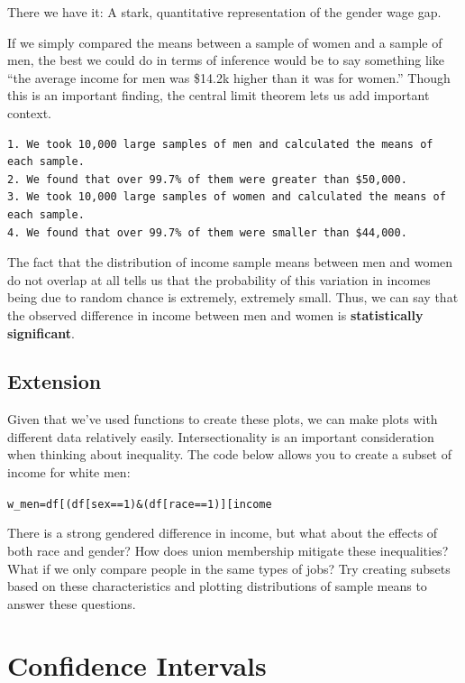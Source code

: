 \documentclass[
  letterpaper,
  DIV=11,
  numbers=noendperiod]{scrreprt}
\begin{document}
There we have it: A stark, quantitative representation of the gender
wage gap.

If we simply compared the means between a sample of women and a sample
of men, the best we could do in terms of inference would be to say
something like ``the average income for men was \$14.2k higher than it
was for women.'' Though this is an important finding, the central limit
theorem lets us add important context.

\begin{verbatim}
1. We took 10,000 large samples of men and calculated the means of each sample.
2. We found that over 99.7% of them were greater than $50,000. 
3. We took 10,000 large samples of women and calculated the means of each sample.
4. We found that over 99.7% of them were smaller than $44,000.
\end{verbatim}

The fact that the distribution of income sample means between men and
women do not overlap at all tells us that the probability of this
variation in incomes being due to random chance is extremely, extremely
small. Thus, we can say that the observed difference in income between
men and women is \textbf{statistically significant}.

\hypertarget{extension-2}{%
\subsection{Extension}\label{extension-2}}

Given that we've used functions to create these plots, we can make plots
with different data relatively easily. Intersectionality is an important
consideration when thinking about inequality. The code below allows you
to create a subset of income for white men:

\texttt{w\_men=df{[}(df{[}\textquotesingle{}sex\textquotesingle{}{]}==1)\&(df{[}\textquotesingle{}race\textquotesingle{}{]}==1){]}{[}\textquotesingle{}income\textquotesingle{}{]}}

There is a strong gendered difference in income, but what about the
effects of both race and gender? How does union membership mitigate
these inequalities? What if we only compare people in the same types of
jobs? Try creating subsets based on these characteristics and plotting
distributions of sample means to answer these questions.

\hypertarget{confidence-intervals}{%
\section{Confidence Intervals}\label{confidence-intervals}}
\end{document}
